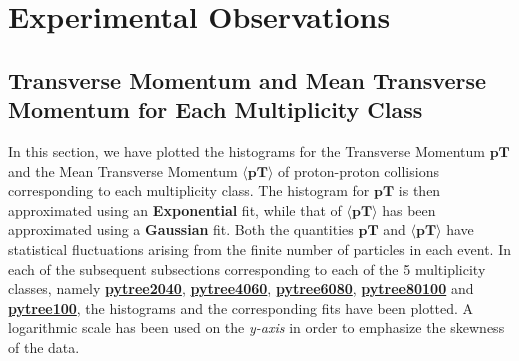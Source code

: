 \documentclass[letterpaper,aps,prc,superscriptaddress,nofootinbib,10pt,showpacs,floatfix]{revtex4-2}%
\begin{document}
\vspace{-3mm}

\section{Experimental Observations }














\subsection{Transverse Momentum and Mean Transverse Momentum for Each Multiplicity Class}
In this section, we have plotted the histograms for the Transverse Momentum $\mathbf{pT}$ and the Mean Transverse Momentum $\mathbf{\langle pT\rangle }$ of proton-proton collisions corresponding to each multiplicity class. The histogram for $\mathbf{pT}$ is then approximated using an \textbf{Exponential} fit, while that of $\mathbf{\langle pT\rangle }$ has been approximated using a \textbf{Gaussian} fit. Both the quantities $\mathbf{pT}$ and $\mathbf{\langle pT\rangle }$ have statistical fluctuations arising from the finite number of particles in each event. In each of the subsequent subsections corresponding to each of the 5 multiplicity classes, namely \hyperref[subsubsec:2040]{\textbf{pytree2040}}, \hyperref[subsubsec:4060]{\textbf{pytree4060}}, \hyperref[subsubsec:6080]{\textbf{pytree6080}}, \hyperref[subsubsec:80100]{\textbf{pytree80100}} and \hyperref[subsubsec:100]{\textbf{pytree100}}, the histograms and the corresponding fits have been plotted. A logarithmic scale has been used on the \emph{y-axis} in order to emphasize the skewness of the data. 
\end{document}
